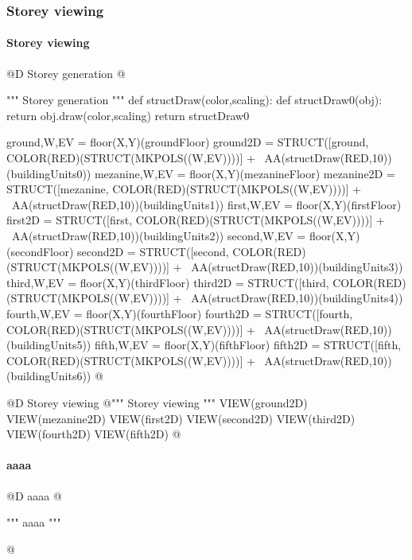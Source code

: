 \documentclass[11pt,oneside]{article}    %
\begin{document}
\subsubsection{Storey viewing}

\paragraph{Storey viewing}
@D Storey generation
@{""" Storey generation """
def structDraw(color,scaling):
    def structDraw0(obj): return obj.draw(color,scaling)
    return structDraw0

ground,W,EV = floor(X,Y)(groundFloor)
ground2D = STRUCT([ground, COLOR(RED)(STRUCT(MKPOLS((W,EV))))] + \
            AA(structDraw(RED,10))(buildingUnits0))
mezanine,W,EV = floor(X,Y)(mezanineFloor)
mezanine2D = STRUCT([mezanine, COLOR(RED)(STRUCT(MKPOLS((W,EV))))] + \
            AA(structDraw(RED,10))(buildingUnits1))
first,W,EV = floor(X,Y)(firstFloor)
first2D = STRUCT([first, COLOR(RED)(STRUCT(MKPOLS((W,EV))))] + \
            AA(structDraw(RED,10))(buildingUnits2))
second,W,EV = floor(X,Y)(secondFloor)
second2D = STRUCT([second, COLOR(RED)(STRUCT(MKPOLS((W,EV))))] + \
            AA(structDraw(RED,10))(buildingUnits3))
third,W,EV = floor(X,Y)(thirdFloor)
third2D = STRUCT([third, COLOR(RED)(STRUCT(MKPOLS((W,EV))))] + \
            AA(structDraw(RED,10))(buildingUnits4))
fourth,W,EV = floor(X,Y)(fourthFloor)
fourth2D = STRUCT([fourth, COLOR(RED)(STRUCT(MKPOLS((W,EV))))] + \
            AA(structDraw(RED,10))(buildingUnits5))
fifth,W,EV = floor(X,Y)(fifthFloor)
fifth2D = STRUCT([fifth, COLOR(RED)(STRUCT(MKPOLS((W,EV))))] + \
            AA(structDraw(RED,10))(buildingUnits6))
@}

@D Storey viewing
@{""" Storey viewing """
VIEW(ground2D)
VIEW(mezanine2D)
VIEW(first2D)
VIEW(second2D)
VIEW(third2D)
VIEW(fourth2D)
VIEW(fifth2D)
@}


\paragraph{aaaa}
@D aaaa
@{""" aaaa """

@}
\end{document}
